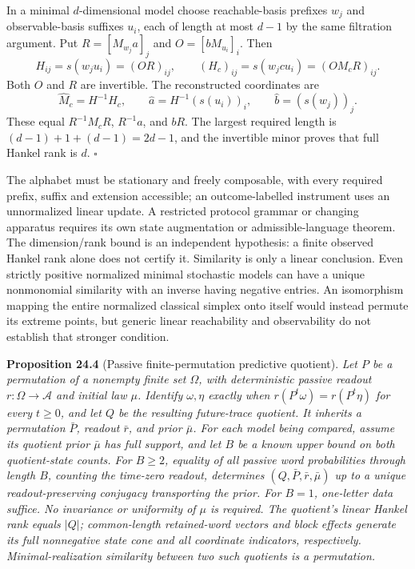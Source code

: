 \documentclass[
]{article}
\begin{document}
In a minimal \(d\)-dimensional model choose reachable-basis prefixes
\(w_j\) and observable-basis suffixes \(u_i\), each of length at most
\(d-1\) by the same filtration argument. Put \(R=[M_{w_j}a]_j\) and
\(O=[bM_{u_i}]_i\). Then \[
H_{ij}=s(w_ju_i)=(OR)_{ij},\qquad
(H_c)_{ij}=s(w_jcu_i)=(OM_cR)_{ij}.
\] Both \(O\) and \(R\) are invertible. The reconstructed coordinates
are \[
\widehat M_c=H^{-1}H_c,\qquad
\widehat a=H^{-1}(s(u_i))_i,\qquad
\widehat b=(s(w_j))_j.
\] These equal \(R^{-1}M_cR\), \(R^{-1}a\), and \(bR\). The largest
required length is \((d-1)+1+(d-1)=2d-1\), and the invertible minor
proves that full Hankel rank is \(d\). \(\square\)

The alphabet must be stationary and freely composable, with every
required prefix, suffix and extension accessible; an outcome-labelled
instrument uses an unnormalized linear update. A restricted protocol
grammar or changing apparatus requires its own state augmentation or
admissible-language theorem. The dimension/rank bound is an independent
hypothesis: a finite observed Hankel rank alone does not certify it.
Similarity is only a linear conclusion. Even strictly positive
normalized minimal stochastic models can have a unique nonmonomial
similarity with an inverse having negative entries. An isomorphism
mapping the entire normalized classical simplex onto itself would
instead permute its extreme points, but generic linear reachability and
observability do not establish that stronger condition.

\textbf{Proposition 24.4} (Passive finite-permutation predictive
quotient). \emph{Let \(P\) be a permutation of a nonempty finite set
\(\Omega\), with deterministic passive readout \(r:\Omega\to\mathcal A\)
and initial law \(\mu\). Identify \(\omega,\eta\) exactly when
\(r(P^t\omega)=r(P^t\eta)\) for every \(t\ge0\), and let \(Q\) be the
resulting future-trace quotient. It inherits a permutation \(\bar P\),
readout \(\bar r\), and prior \(\bar\mu\). For each model being
compared, assume its quotient prior \(\bar\mu\) has full support, and
let \(B\) be a known upper bound on both quotient-state counts. For
\(B\ge2\), equality of all passive word probabilities through length
\(B\), counting the time-zero readout, determines
\((Q,\bar P,\bar r,\bar\mu)\) up to a unique readout-preserving
conjugacy transporting the prior. For \(B=1\), one-letter data suffice.
No invariance or uniformity of \(\mu\) is required. The quotient's
linear Hankel rank equals \(|Q|\); common-length retained-word vectors
and block effects generate its full nonnegative state cone and all
coordinate indicators, respectively. Minimal-realization similarity
between two such quotients is a permutation.}
\end{document}
